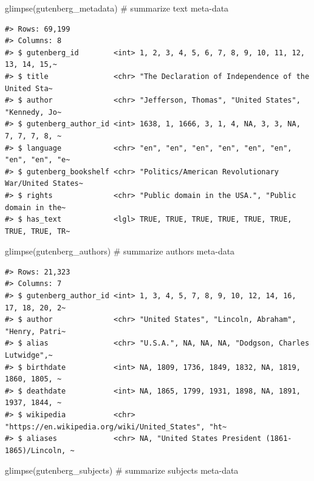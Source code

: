 \documentclass[
  letterpaper,
]{latex/krantz}
\newenvironment{Shaded}{\begin{snugshade}}{\end{snugshade}}
\newcommand{\CommentTok}[1]{\textcolor[rgb]{0.37,0.37,0.37}{#1}}
\newcommand{\FunctionTok}[1]{\textcolor[rgb]{0.28,0.35,0.67}{#1}}
\newcommand{\NormalTok}[1]{\textcolor[rgb]{0.00,0.23,0.31}{#1}}
\begin{document}
\begin{Shaded}
\begin{Highlighting}[]
\FunctionTok{glimpse}\NormalTok{(gutenberg\_metadata) }\CommentTok{\# summarize text meta{-}data}
\end{Highlighting}
\end{Shaded}

\begin{verbatim}
#> Rows: 69,199
#> Columns: 8
#> $ gutenberg_id        <int> 1, 2, 3, 4, 5, 6, 7, 8, 9, 10, 11, 12, 13, 14, 15,~
#> $ title               <chr> "The Declaration of Independence of the United Sta~
#> $ author              <chr> "Jefferson, Thomas", "United States", "Kennedy, Jo~
#> $ gutenberg_author_id <int> 1638, 1, 1666, 3, 1, 4, NA, 3, 3, NA, 7, 7, 7, 8, ~
#> $ language            <chr> "en", "en", "en", "en", "en", "en", "en", "en", "e~
#> $ gutenberg_bookshelf <chr> "Politics/American Revolutionary War/United States~
#> $ rights              <chr> "Public domain in the USA.", "Public domain in the~
#> $ has_text            <lgl> TRUE, TRUE, TRUE, TRUE, TRUE, TRUE, TRUE, TRUE, TR~
\end{verbatim}

\begin{Shaded}
\begin{Highlighting}[]
\FunctionTok{glimpse}\NormalTok{(gutenberg\_authors) }\CommentTok{\# summarize authors meta{-}data}
\end{Highlighting}
\end{Shaded}

\begin{verbatim}
#> Rows: 21,323
#> Columns: 7
#> $ gutenberg_author_id <int> 1, 3, 4, 5, 7, 8, 9, 10, 12, 14, 16, 17, 18, 20, 2~
#> $ author              <chr> "United States", "Lincoln, Abraham", "Henry, Patri~
#> $ alias               <chr> "U.S.A.", NA, NA, NA, "Dodgson, Charles Lutwidge",~
#> $ birthdate           <int> NA, 1809, 1736, 1849, 1832, NA, 1819, 1860, 1805, ~
#> $ deathdate           <int> NA, 1865, 1799, 1931, 1898, NA, 1891, 1937, 1844, ~
#> $ wikipedia           <chr> "https://en.wikipedia.org/wiki/United_States", "ht~
#> $ aliases             <chr> NA, "United States President (1861-1865)/Lincoln, ~
\end{verbatim}

\begin{Shaded}
\begin{Highlighting}[]
\FunctionTok{glimpse}\NormalTok{(gutenberg\_subjects) }\CommentTok{\# summarize subjects meta{-}data}
\end{Highlighting}
\end{Shaded}
\end{document}
